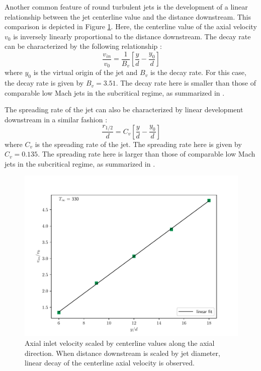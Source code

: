 Another common feature of round turbulent jets is the development of a linear relationship between the jet centerline value and the distance downstream. This comparison is depicted in Figure \ref{330_centerline_scaling}. Here, the centerline value of the axial velocity $v_0$ is inversely linearly proportional to the distance downstream. The decay rate can be characterized by the following relationship \cite{iso_comp_1}:
\begin{equation} \label{decay_rate}
\dfrac{v_{in}}{v_0} = \dfrac{1}{B_v}\left[ \dfrac{y}{d} - \dfrac{y_0}{d} \right]
\end{equation}
where $y_0$ is the virtual origin of the jet \cite{Pope} and $B_v$ is the decay rate. For this case, the decay rate is given by $B_v = 3.51$.  The decay rate here is smaller than those of comparable low Mach jets in the subcritical regime, as summarized in \cite{iso_comp_1_ref_1}. 

The spreading rate of the jet can also be characterized by linear development downstream in a similar fashion \cite{iso_comp_1_ref_1}:
\begin{equation} \label{spread_rate}
\dfrac{r_{1/2}}{d} = C_v\left[ \dfrac{y}{d} - \dfrac{y_0}{d} \right]
\end{equation}
where $C_v$ is the spreading rate of the jet. The spreading rate here is given by $C_v=0.135$. The spreading rate here is larger than those of comparable low Mach jets in the subcritical regime, as summarized in \cite{iso_comp_1_ref_1}. 

\begin{figure}[H]
\begin{center}
	\includegraphics[scale=.7]{figures/Plots/radial/slices_3/same_ambient/uin_u0_vs_x_d.pdf}
	\caption{Axial inlet velocity scaled by centerline values along the axial direction. When distance downstream is scaled by jet diameter, linear decay of the centerline axial velocity is observed.} \label{330_centerline_scaling}
\end{center}
\end{figure}

